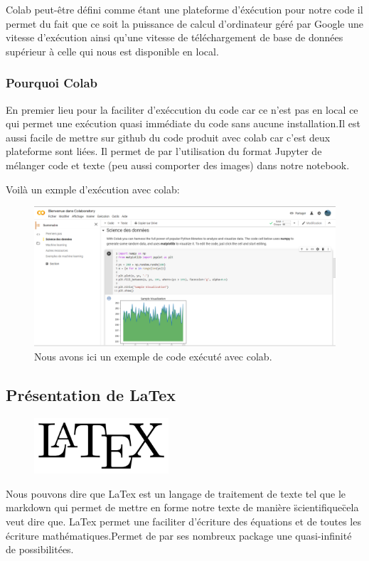 Colab peut-être défini comme étant une plateforme d'éxécution pour notre code
il permet du fait que ce soit la puissance de calcul d'ordinateur géré par Google une vitesse d'exécution ainsi qu'une vitesse de téléchargement de base de données supérieur à celle qui nous est disponible en local.

\hypertarget{Pourquoi-Colab}{%
\subsubsection{Pourquoi Colab}
\label{Pourquoi-Colab}}
En premier lieu pour la faciliter d'exéccution du code car ce n'est pas en local ce qui permet une exécution quasi immédiate du code sans aucune installation.Il est aussi facile de mettre sur github du code produit avec colab car c'est deux plateforme sont liées. Il permet de par l'utilisation du format Jupyter de mélanger code et texte (peu aussi comporter des images) dans notre notebook.

Voilà un exmple d'exécution avec colab:

\begin{figure}[h]
\begin{center}
\includegraphics[width=15cm]{./images/Cap_colab.PNG}
\caption{Nous avons ici un exemple de code exécuté avec colab.}
\end{center}
\end{figure}


\hypertarget{Pruxe9sentation-de-LaTex}{%
\subsection{Présentation de LaTex}
\label{Pruxe9sentation-de-LaTex}}

\begin{figure}[h]
  \begin{center}
\includegraphics[width=5cm]{./images/Latex.png}
\end{center}
\end{figure}

Nous pouvons dire que LaTex est un langage de traitement de texte tel que le markdown qui permet de mettre en forme notre texte de manière \"scientifique\" cela veut dire que. LaTex permet une faciliter d'écriture des équations et de toutes les écriture mathématiques.Permet de par ses nombreux package une quasi-infinité de possibilitées.
